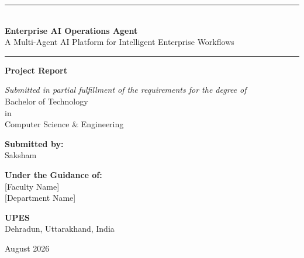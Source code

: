 \documentclass[12pt, a4paper]{report}
\begin{document}
\begin{titlepage}
\begin{center}

\vspace*{1cm}

\rule{\linewidth}{1pt}\\[0.4cm]
{\Huge \textbf{Enterprise AI Operations Agent}}\\[0.3cm]
{\Large A Multi-Agent AI Platform for Intelligent Enterprise Workflows}\\[0.2cm]
\rule{\linewidth}{1pt}

\vspace{1.5cm}

{\Large \textbf{Project Report}}

\vspace{1cm}

\textit{Submitted in partial fulfillment of the requirements for the degree of}\\[0.3cm]
{\large Bachelor of Technology}\\[0.2cm]
{\large in}\\[0.2cm]
{\large Computer Science \& Engineering}

\vspace{1.5cm}

{\large \textbf{Submitted by:}}\\[0.3cm]
{\Large Saksham}\\[0.2cm]

\vspace{1cm}

{\large \textbf{Under the Guidance of:}}\\[0.3cm]
{\Large [Faculty Name]}\\[0.2cm]
{\large [Department Name]}

\vspace{1.5cm}

\begin{figure}[H]
\centering
\end{figure}

{\large \textbf{UPES}}\\[0.2cm]
{\large Dehradun, Uttarakhand, India}

\vspace{1cm}

{\large August 2026}

\end{center}
\end{titlepage}
\end{document}
